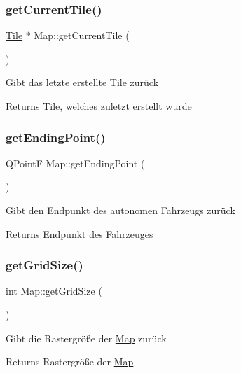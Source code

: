 \subsubsection{\texorpdfstring{get\+Current\+Tile()}{getCurrentTile()}}
{\footnotesize\ttfamily \mbox{\hyperlink{class_tile}{Tile}} $\ast$ Map\+::get\+Current\+Tile (\begin{DoxyParamCaption}{ }\end{DoxyParamCaption})}

Gibt das letzte erstellte \mbox{\hyperlink{class_tile}{Tile}} zurück \begin{DoxyReturn}{Returns}
\mbox{\hyperlink{class_tile}{Tile}}, welches zuletzt erstellt wurde 
\end{DoxyReturn}
\mbox{\label{class_map_a89f8852e818ad3c4ff7ff3ff9434e544}} 
\subsubsection{\texorpdfstring{get\+Ending\+Point()}{getEndingPoint()}}
{\footnotesize\ttfamily Q\+PointF Map\+::get\+Ending\+Point (\begin{DoxyParamCaption}{ }\end{DoxyParamCaption})}

Gibt den Endpunkt des autonomen Fahrzeugs zurück \begin{DoxyReturn}{Returns}
Endpunkt des Fahrzeuges 
\end{DoxyReturn}
\mbox{\label{class_map_aced3d71b8481cf37e218ff4ddb987874}} 
\subsubsection{\texorpdfstring{get\+Grid\+Size()}{getGridSize()}}
{\footnotesize\ttfamily int Map\+::get\+Grid\+Size (\begin{DoxyParamCaption}{ }\end{DoxyParamCaption})}

Gibt die Rastergröße der \mbox{\hyperlink{class_map}{Map}} zurück \begin{DoxyReturn}{Returns}
Rastergröße der \mbox{\hyperlink{class_map}{Map}} 
\end{DoxyReturn}
\mbox{\label{class_map_ada28e2fd173999bcf7981d55de145d6d}} 
